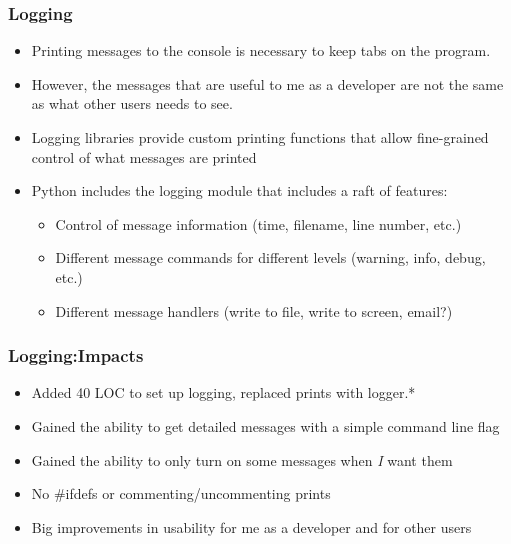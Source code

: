 \documentclass[red, hyperref={pdfpagelabels=false}]{beamer}
\begin{document}
\begin{frame}
  \frametitle{Logging}
  \begin{itemize}
    \item Printing messages to the console is necessary to keep tabs on the program.
    \item However, the messages that are useful to me as a developer are not the
      same as what other users needs to see.
    \item Logging libraries provide custom printing functions that allow fine-grained
      control of what messages are printed
    \item Python includes the logging module that includes a raft of features:
    \begin{itemize}
      \item Control of message information (time, filename, line number, etc.)
      \item Different message commands for different levels (warning, info, debug, etc.)
      \item Different message handlers (write to file, write to screen, email?)
    \end{itemize}
  \end{itemize}
\end{frame}

\begin{frame}
  \frametitle{Logging:Impacts}
  \begin{itemize}
    \item Added 40 LOC to set up logging, replaced prints with logger.*
    \item Gained the ability to get detailed messages with a simple command line flag
    \item Gained the ability to only turn on some messages when \emph{I} want them
    \item No \#ifdefs or commenting/uncommenting prints
    \item Big improvements in usability for me as a developer and for other users
  \end{itemize}
\end{frame}
\end{document}
